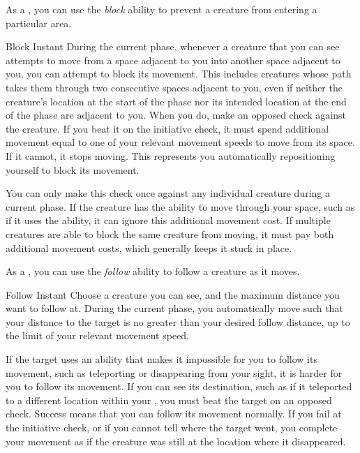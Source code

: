          As a , you can use the \textit{block} ability to prevent a creature from entering a particular area.

        \begin{instantability}{Block}
            \label{Block}
            Instant
            \rankline
            During the current phase, whenever a creature that you can see attempts to move from a space adjacent to you into another space adjacent to you, you can attempt to block its movement.
            This includes creatures whose path takes them through two consecutive spaces adjacent to you, even if neither the creature's location at the start of the phase nor its intended location at the end of the phase are adjacent to you.
            When you do, make an opposed  check against the creature.
            If you beat it on the initiative check, it must spend additional movement equal to one of your relevant movement speeds to move from its space.
            If it cannot, it stops moving.
            This represents you automatically repositioning yourself to block its movement.

            You can only make this check once against any individual creature during a current phase.
            If the creature has the ability to move through your space, such as if it uses the  ability, it can ignore this additional movement cost.
            If multiple creatures are able to block the same creature from moving, it must pay both additional movement costs, which generally keeps it stuck in place.
        \end{instantability}

         As a , you can use the \textit{follow} ability to follow a creature as it moves.

        \begin{instantability}{Follow}
            \label{Follow}
            Instant
            \rankline
            Choose a creature you can see, and the maximum distance you want to follow at.
            During the current phase, you automatically move such that your distance to the target is no greater than your desired follow distance, up to the limit of your relevant movement speed.

            If the target uses an ability that makes it impossible for you to follow its movement, such as teleporting or disappearing from your sight, it is harder for you to follow its movement.
            If you can see its destination, such as if it teleported to a different location within your , you must beat the target on an opposed  check.
            Success means that you can follow its movement normally.
            If you fail at the initiative check, or if you cannot tell where the target went, you complete your movement as if the creature was still at the location where it disappeared.
        \end{instantability}

